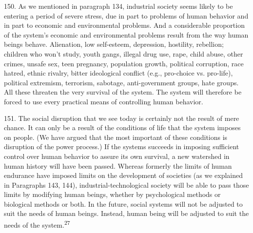 \documentclass{article}
\begin{document}
150.  As we mentioned in paragraph 134, industrial society seems likely to be entering a period of 
severe stress, due in part to problems of human behavior and in part to economic and 
environmental problems.  And a considerable proportion of the system’s economic and 
environmental problems result from the way human beings behave.  Alienation, low self-esteem, 
depression, hostility, rebellion; children who won’t study, youth gangs, illegal drug use, rape, child 
abuse,  other  crimes,  unsafe  sex,  teen  pregnancy,  population  growth,  political  corruption,  race  
hatred, ethnic rivalry, bitter ideological conflict (e.g., pro-choice vs.  pro-life), political extremism, 
terrorism, sabotage, anti-government groups, hate groups.  All these threaten the very survival of 
the system.  The system will therefore be forced to use every practical means of controlling human 
behavior. \vspace{\baselineskip}

151.  The social disruption that we see today is certainly not the result of mere chance.  It can only 
be a result of the conditions of life that the system imposes on people.  (We have argued that the 
most important of these conditions is disruption of the power process.) If the systems succeeds in 
imposing sufficient control over human behavior to assure its own survival, a new watershed in 
human  history  will  have  been  passed.   Whereas  formerly  the  limits  of  human  endurance  have  
imposed  limits  on  the  development  of  societies  (as  we  explained  in  Paragraphs  143,  144),  
industrial-technological  society  will  be  able  to  pass  those  limits  by  modifying  human  beings,  
whether  by  psychological  methods  or  biological  methods  or  both.   In  the  future,  social  systems  
will not be adjusted to suit the needs of human beings.  Instead, human being will be adjusted to 
suit the needs of the system.\textsuperscript{27} \vspace{\baselineskip}
\end{document}
